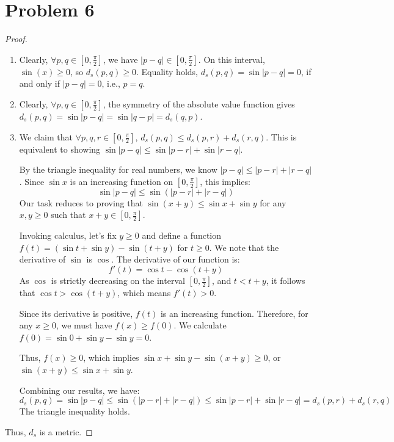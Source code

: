 \documentclass[11pt]{article}
\renewcommand{\_}[1]{\underline{ #1 }}
\theoremstyle{definition}
\numberwithin{equation}{subsection}
\begin{document}
\bigskip

\section*{Problem 6}
\begin{proof}
\begin{enumerate}
    \item Clearly, $\forall p,q\in [0,\frac{\pi}{2}]$, we have $|p-q| \in [0, \frac{\pi}{2}]$. On this interval, $\sin(x) \ge 0$, so $d_s(p,q) \ge 0$. Equality holds, $d_s(p,q) = \sin|p-q|=0$, if and only if $|p-q|=0$, i.e., $p=q$.
    
    \item Clearly, $\forall p,q\in [0,\frac{\pi}{2}]$, the symmetry of the absolute value function gives $d_s(p,q) = \sin|p-q| = \sin|q-p| = d_s(q,p)$.
    
    \item We claim that $\forall p,q,r\in [0,\frac{\pi}{2}]$, $d_s(p,q) \leq d_s(p,r)+d_s(r,q)$. This is equivalent to showing $\sin|p-q| \leq \sin|p-r| + \sin|r-q|$.
    
    By the triangle inequality for real numbers, we know $|p-q| \le |p-r| + |r-q|$. Since $\sin x$ is an increasing function on $[0, \frac{\pi}{2}]$, this implies:
    $$ \sin|p-q| \le \sin(|p-r| + |r-q|) $$
    Our task reduces to proving that $\sin(x+y) \le \sin x + \sin y$ for any $x, y \ge 0$ such that $x+y \in [0, \frac{\pi}{2}]$.
    
    Invoking calculus, let's fix $y \ge 0$ and define a function $f(t) = (\sin t + \sin y) - \sin(t+y)$ for $t \ge 0$. We note that the derivative of $\sin$ is $\cos$. The derivative of our function is:
    $$ f'(t) = \cos t - \cos(t+y) $$
    As $\cos$ is strictly decreasing on the interval $[0,\frac{\pi}{2}]$, and $t < t+y$, it follows that $\cos t > \cos(t+y)$, which means $f'(t) > 0$.
    
    Since its derivative is positive, $f(t)$ is an increasing function. Therefore, for any $x \ge 0$, we must have $f(x) \ge f(0)$. We calculate $f(0) = \sin 0 + \sin y - \sin y = 0$.
    
    Thus, $f(x) \ge 0$, which implies $\sin x + \sin y - \sin(x+y) \ge 0$, or $\sin(x+y) \le \sin x + \sin y$.
    
    Combining our results, we have:
    $$ d_s(p,q) = \sin|p-q| \le \sin(|p-r| + |r-q|) \le \sin|p-r| + \sin|r-q| = d_s(p,r)+d_s(r,q) $$
    The triangle inequality holds.
\end{enumerate}
Thus, $d_s$ is a metric.
\end{proof}
\end{document}
